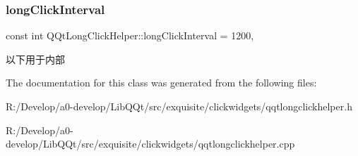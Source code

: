 \subsubsection{\texorpdfstring{long\+Click\+Interval}{longClickInterval}}
{\footnotesize\ttfamily const int Q\+Qt\+Long\+Click\+Helper\+::long\+Click\+Interval = 1200\hspace{0.3cm}{\ttfamily [static]}, {\ttfamily [protected]}}

以下用于内部 

The documentation for this class was generated from the following files\+:\begin{DoxyCompactItemize}
\item 
R\+:/\+Develop/a0-\/develop/\+Lib\+Q\+Qt/src/exquisite/clickwidgets/qqtlongclickhelper.\+h\item 
R\+:/\+Develop/a0-\/develop/\+Lib\+Q\+Qt/src/exquisite/clickwidgets/qqtlongclickhelper.\+cpp\end{DoxyCompactItemize}
